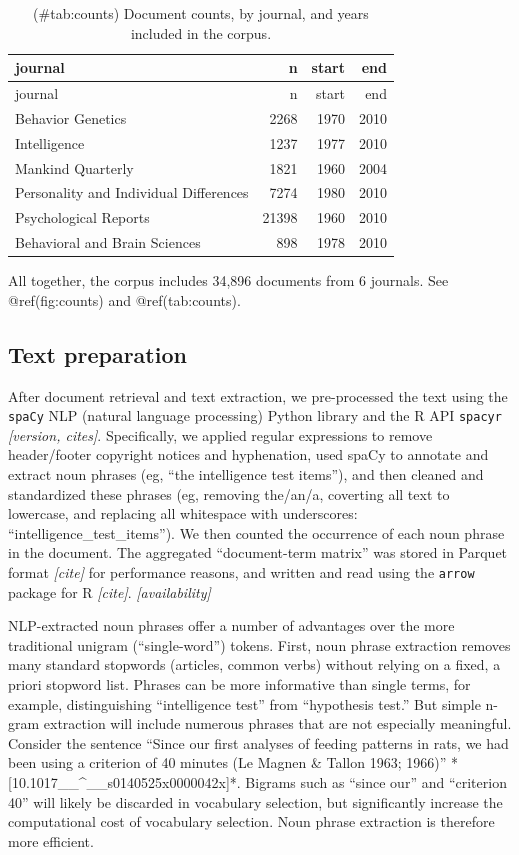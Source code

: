 \documentclass[12pt]{article}
\begin{document}
\begin{longtable}[]{@{}lrrr@{}}
\caption{(\#tab:counts) Document counts, by journal, and years included in the corpus.}\tabularnewline
\toprule
journal & n & start & end \\
\midrule
\endfirsthead
\toprule
journal & n & start & end \\
\midrule
\endhead
Behavior Genetics & 2268 & 1970 & 2010 \\
Intelligence & 1237 & 1977 & 2010 \\
Mankind Quarterly & 1821 & 1960 & 2004 \\
Personality and Individual Differences & 7274 & 1980 & 2010 \\
Psychological Reports & 21398 & 1960 & 2010 \\
Behavioral and Brain Sciences & 898 & 1978 & 2010 \\
\bottomrule
\end{longtable}

All together, the corpus includes 34,896 documents from 6 journals. See @ref(fig:counts) and @ref(tab:counts).

\hypertarget{text-preparation}{%
\subsection*{Text preparation}\label{text-preparation}}

After document retrieval and text extraction, we pre-processed the text using the \texttt{spaCy} NLP (natural language processing) Python library and the R API \texttt{spacyr} \emph{{[}version, cites{]}}. Specifically, we applied regular expressions to remove header/footer copyright notices and hyphenation, used spaCy to annotate and extract noun phrases (eg, ``the intelligence test items''), and then cleaned and standardized these phrases (eg, removing the/an/a, coverting all text to lowercase, and replacing all whitespace with underscores: ``intelligence\_test\_items''). We then counted the occurrence of each noun phrase in the document. The aggregated ``document-term matrix'' was stored in Parquet format \emph{{[}cite{]}} for performance reasons, and written and read using the \texttt{arrow} package for R \emph{{[}cite{]}}. \emph{{[}availability{]}}

NLP-extracted noun phrases offer a number of advantages over the more traditional unigram (``single-word'') tokens. First, noun phrase extraction removes many standard stopwords (articles, common verbs) without relying on a fixed, a priori stopword list. Phrases can be more informative than single terms, for example, distinguishing ``intelligence test'' from ``hypothesis test.'' But simple n-gram extraction will include numerous phrases that are not especially meaningful. Consider the sentence ``Since our first analyses of feeding patterns in rats, we had been using a criterion of 40 minutes (Le Magnen \& Tallon 1963; 1966)'' *{[}10.1017\_\_\^{}\_\_s0140525x0000042x{]}*. Bigrams such as ``since our'' and ``criterion 40'' will likely be discarded in vocabulary selection, but significantly increase the computational cost of vocabulary selection. Noun phrase extraction is therefore more efficient.
\end{document}
